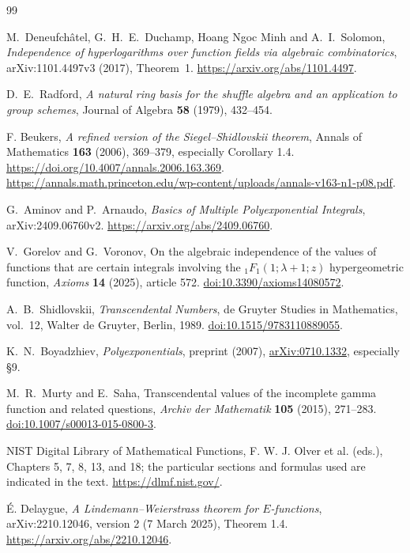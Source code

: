 \documentclass[11pt,a4paper]{article}
\theoremstyle{definition}
\theoremstyle{remark}
\numberwithin{equation}{section}
\begin{document}
\clearpage
{}
\begin{thebibliography}{99}
\raggedright
{}
M.~Deneufch\^atel, G.~H.~E.~Duchamp, Hoang Ngoc Minh and A.~I.~Solomon,
\emph{Independence of hyperlogarithms over function fields via algebraic
combinatorics}, arXiv:1101.4497v3 (2017), Theorem~1.
\url{https://arxiv.org/abs/1101.4497}.

D.~E.~Radford, \emph{A natural ring basis for the shuffle algebra and
an application to group schemes}, Journal of Algebra \textbf{58}
(1979), 432--454.

F. Beukers,
\emph{A refined version of the Siegel--Shidlovskii theorem},
Annals of Mathematics \textbf{163} (2006), 369--379,
especially Corollary 1.4.
\url{https://doi.org/10.4007/annals.2006.163.369}.
\url{https://annals.math.princeton.edu/wp-content/uploads/annals-v163-n1-p08.pdf}.

G.~Aminov and P.~Arnaudo, \emph{Basics of Multiple Polyexponential
Integrals}, arXiv:2409.06760v2.
\url{https://arxiv.org/abs/2409.06760}.

V.~Gorelov and G.~Voronov, On the algebraic independence of the values
of functions that are certain integrals involving the
${}_1F_1(1;\lambda+1;z)$ hypergeometric function,
\emph{Axioms} \textbf{14} (2025), article 572.
\href{https://doi.org/10.3390/axioms14080572}{doi:10.3390/axioms14080572}.

A.~B.~Shidlovskii, \emph{Transcendental Numbers}, de Gruyter Studies
in Mathematics, vol.~12, Walter de Gruyter, Berlin, 1989.
\href{https://doi.org/10.1515/9783110889055}{doi:10.1515/9783110889055}.

K.~N.~Boyadzhiev, \emph{Polyexponentials}, preprint (2007),
\href{https://arxiv.org/abs/0710.1332}{arXiv:0710.1332}, especially \S9.

M.~R.~Murty and E.~Saha, Transcendental values of the incomplete gamma
function and related questions,
\emph{Archiv der Mathematik} \textbf{105} (2015), 271--283.
\href{https://doi.org/10.1007/s00013-015-0800-3}{doi:10.1007/s00013-015-0800-3}.

NIST Digital Library of Mathematical Functions,
F. W. J. Olver et al. (eds.),
Chapters 5, 7, 8, 13, and 18; the particular sections and formulas
used are indicated in the text. \url{https://dlmf.nist.gov/}.

\'{E}. Delaygue, \emph{A Lindemann--Weierstrass theorem for $E$-functions},
arXiv:2210.12046, version 2 (7 March 2025), Theorem 1.4.
\url{https://arxiv.org/abs/2210.12046}.


\end{thebibliography}
\end{document}

